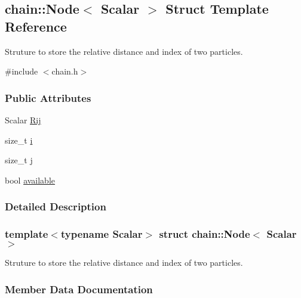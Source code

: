 \hypertarget{structchain_1_1_node}{}\subsection{chain\+:\+:Node$<$ Scalar $>$ Struct Template Reference}
\label{structchain_1_1_node}


Struture to store the relative distance and index of two particles.  




{\ttfamily \#include $<$chain.\+h$>$}

\subsubsection*{Public Attributes}
\begin{DoxyCompactItemize}
\item 
Scalar \mbox{\hyperlink{structchain_1_1_node_a3a9ca49370eba9c8ce1d6b2a146c93ee}{Rij}}
\item 
size\+\_\+t \mbox{\hyperlink{structchain_1_1_node_a289ef3bad054158a446e53481c2a9d17}{i}}
\item 
size\+\_\+t \mbox{\hyperlink{structchain_1_1_node_aa41c0c59d6cdd4263a72b9e5284aa3d9}{j}}
\item 
bool \mbox{\hyperlink{structchain_1_1_node_ac06192f15a8dba90e35c508b17aa0e63}{available}}
\end{DoxyCompactItemize}


\subsubsection{Detailed Description}
\subsubsection*{template$<$typename Scalar$>$\newline
struct chain\+::\+Node$<$ Scalar $>$}

Struture to store the relative distance and index of two particles. 

\subsubsection{Member Data Documentation}
\mbox{\label{structchain_1_1_node_ac06192f15a8dba90e35c508b17aa0e63}} 
